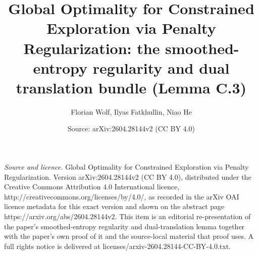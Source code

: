 \documentclass[10pt,a4paper]{amsart}
\title[Global optimality for constrained exploration]{Global Optimality for Constrained Exploration via Penalty Regularization: the smoothed-entropy regularity and dual translation bundle (Lemma C.3)}
\author[F. Wolf, I. Fatkhullin, N. He]{Florian
Wolf, Ilyas Fatkhullin, Niao He}
\date{Source: arXiv:2604.28144v2 (CC BY 4.0)}
\theoremstyle{plain}
\theoremstyle{definition}
\theoremstyle{remark}
\begin{document}
\maketitle
\vspace{1em}
\noindent\textit{Source and licence.} Global Optimality for Constrained Exploration via Penalty Regularization. Version arXiv:2604.28144v2 (CC BY 4.0), distributed under the Creative Commons Attribution 4.0 International licence, http://creativecommons.org/licenses/by/4.0/, as recorded in the arXiv OAI licence metadata for this exact version and shown on the abstract page https://arxiv.org/abs/2604.28144v2. This item is an editorial re-presentation of the paper's smoothed-entropy regularity and dual-translation lemma together with the paper's own proof of it and the source-local material that proof uses. A full rights notice is delivered at licenses/arxiv-2604.28144-CC-BY-4.0.txt.
\end{document}
